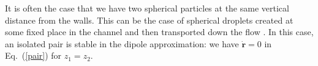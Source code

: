 It is often the case that we have two spherical particles at the same vertical distance from the walls. This can be the case of spherical droplets created at some fixed place in the channel and then transported down the flow \cite{tab0}. In this case, an isolated pair is stable in the dipole approximation: we have $\dot{\bm r}=0$ in Eq.~(\ref{pair}) for $z_1=z_2$.
%

